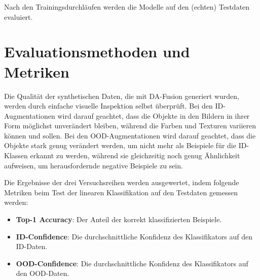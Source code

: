 Nach den Trainingsdurchläufen werden die Modelle auf den (echten) Testdaten evaluiert.

\section{Evaluationsmethoden und Metriken} \label{sec:evaluation}

Die Qualität der synthetischen Daten, die mit DA-Fusion generiert wurden, werden durch einfache visuelle Inspektion selbst überprüft. Bei den ID-Augmentationen wird darauf geachtet, dass die Objekte in den Bildern in ihrer Form möglichst unverändert bleiben, während die Farben und Texturen variieren können und sollen. Bei den OOD-Augmentationen wird darauf geachtet, dass die Objekte stark genug verändert werden, um nicht mehr als Beispiele für die ID-Klassen erkannt zu werden, während sie gleichzeitig noch genug Ähnlichkeit aufweisen, um herausfordernde negative Beispiele zu sein.

Die Ergebnisse der drei Versuchsreihen werden ausgewertet, indem folgende Metriken beim Test der linearen Klassifikation auf den Testdaten gemessen werden:

\begin{itemize}
	\item \textbf{Top-1 Accuracy}: Der Anteil der korrekt klassifizierten Beispiele.
	\item \textbf{ID-Confidence}: Die durchschnittliche Konfidenz des Klassifikators auf den ID-Daten.
	\item \textbf{OOD-Confidence}: Die durchschnittliche Konfidenz des Klassifikators auf den OOD-Daten.
\end{itemize}